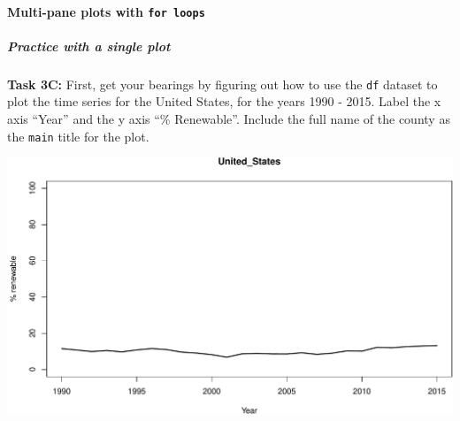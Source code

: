 \documentclass[
]{book}
\newenvironment{Shaded}{\begin{snugshade}}{\end{snugshade}}
\newcommand{\CommentTok}[1]{\textcolor[rgb]{0.56,0.35,0.01}{\textit{#1}}}
\newcommand{\DataTypeTok}[1]{\textcolor[rgb]{0.13,0.29,0.53}{#1}}
\newcommand{\DecValTok}[1]{\textcolor[rgb]{0.00,0.00,0.81}{#1}}
\newcommand{\KeywordTok}[1]{\textcolor[rgb]{0.13,0.29,0.53}{\textbf{#1}}}
\newcommand{\NormalTok}[1]{#1}
\newcommand{\StringTok}[1]{\textcolor[rgb]{0.31,0.60,0.02}{#1}}
\begin{document}
\hypertarget{multi-pane-plots-with-for-loops}{%
\paragraph{\texorpdfstring{Multi-pane plots with \texttt{for\ loops}}{Multi-pane plots with for loops}}\label{multi-pane-plots-with-for-loops}}

\hypertarget{practice-with-a-single-plot}{%
\subparagraph{Practice with a single plot}\label{practice-with-a-single-plot}}

\textbf{Task 3C:} First, get your bearings by figuring out how to use the \texttt{df} dataset to plot the time series for the United States, for the years 1990 - 2015. Label the x axis ``Year'' and the y axis ``\% Renewable''. Include the full name of the county as the \texttt{main} title for the plot.

\begin{Shaded}
\end{Shaded}

\includegraphics{figures/unnamed-chunk-497-1.pdf}
\end{document}
